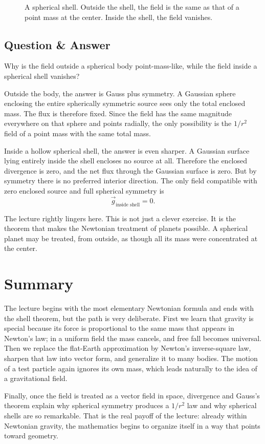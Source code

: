 \begin{figure}
\centering
{}
\caption{A spherical shell. Outside the shell, the field is the same as that of a point mass at the center. Inside the shell, the field vanishes.}
\end{figure}

\subsection{Question \& Answer}

Why is the field outside a spherical body point-mass-like, while the field inside a spherical shell vanishes?

Outside the body, the answer is Gauss plus symmetry. A Gaussian sphere enclosing the entire spherically symmetric source sees only the total enclosed mass. The flux is therefore fixed. Since the field has the same magnitude everywhere on that sphere and points radially, the only possibility is the \(1/r^2\) field of a point mass with the same total mass.

Inside a hollow spherical shell, the answer is even sharper. A Gaussian surface lying entirely inside the shell encloses no source at all. Therefore the enclosed divergence is zero, and the net flux through the Gaussian surface is zero. But by symmetry there is no preferred interior direction. The only field compatible with zero enclosed source and full spherical symmetry is
\[
\vec g_{\text{inside shell}}=0.
\]

The lecture rightly lingers here. This is not just a clever exercise. It is the theorem that makes the Newtonian treatment of planets possible. A spherical planet may be treated, from outside, as though all its mass were concentrated at the center.

\section{Summary}

The lecture begins with the most elementary Newtonian formula and ends with the shell theorem, but the path is very deliberate. First we learn that gravity is special because its force is proportional to the same mass that appears in Newton's law; in a uniform field the mass cancels, and free fall becomes universal. Then we replace the flat-Earth approximation by Newton's inverse-square law, sharpen that law into vector form, and generalize it to many bodies. The motion of a test particle again ignores its own mass, which leads naturally to the idea of a gravitational field.

Finally, once the field is treated as a vector field in space, divergence and Gauss's theorem explain why spherical symmetry produces a \(1/r^2\) law and why spherical shells are so remarkable. That is the real payoff of the lecture: already within Newtonian gravity, the mathematics begins to organize itself in a way that points toward geometry.